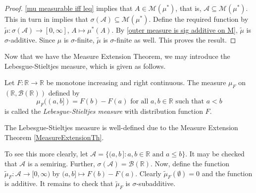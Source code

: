 \begin{proof}
    \ref{mu measurable iff leq} implies that $A\in\mathcal{M}(\mu^*)$, that is, $\mathcal{A}\subseteq\mathcal{M}(\mu^*)$. This in turn in implies that $\sigma(\mathcal{A})\subseteq\mathcal{M}(\mu^*)$. Define the required function by $\tilde\mu:\sigma(\mathcal{A})\to[0,\infty]$, $A\mapsto\mu^*(A)$. By \ref{outer measure is sig additive on M}, $\tilde\mu$ is $\sigma$-additive. Since $\mu$ is $\sigma$-finite, $\tilde\mu$ is $\sigma$-finite as well. This proves the result.
\end{proof}

Now that we have the Measure Extension Theorem, we may introduce the Lebesgue-Stieltjes measure, which is given as follows.

\begin{definition}
\label{defLebStielMeasure}
    Let $F:\mathbb{R}\to\mathbb{R}$ be monotone increasing and right continuous. The measure $\mu_F$ on $(\mathbb{R},\mathcal{B}(\mathbb{R}))$ defined by 
    $$\mu_F((a,b])= F(b)-F(a)\text{ for all $a,b\in\mathbb{R}$ such that $a<b$}$$
    is called the \textit{Lebesgue-Stieltjes measure} with distribution function $F$.
\end{definition}

The Lebesgue-Stieltjes measure is well-defined due to the Measure Extension Theorem \ref{MeasureExtensionTh}.

\vspace{1mm}
To see this more clearly, let $\mathcal{A}=\{(a,b\,]:a,b\in\mathbb{R}\text{ and }a\leq b\}$. It may be checked that $\mathcal{A}$ is a semiring. Further, $\sigma(\mathcal{A})=\mathcal{B}(\mathbb{R})$. Now, define the function $\tilde\mu_F:\mathcal{A}\to[0,\infty)$ by $(a,b]\mapsto F(b)-F(a)$. Clearly $\tilde\mu_F(\emptyset)=0$ and the function is additive. It remains to check that $\tilde\mu_F$ is $\sigma$-subadditive.

